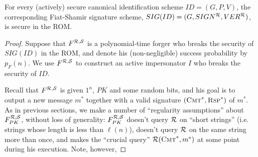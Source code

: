 \begin{thm}
For every (actively) secure canonical identification scheme $ID = (G,P,V)$,
the corresponding Fiat-Shamir signature scheme, $SIG(ID) =
(G,SIGN^{\mathcal{R}},VER^{\mathcal{R}})$, is secure in the ROM.
\end{thm}
\begin{proof}
Suppose that $F^{\mathcal{R},\mathcal{S}}$ is a polynomial-time forger who breaks the
security of $SIG(ID)$ in the ROM, and denote his (non-negligible) success
probability by $p_F(n)$. We use $F^{\mathcal{R},\mathcal{S}}$ to construct an active
impersonator $I$ who breaks the security of $ID$. 

Recall that $F^{\mathcal{R},\mathcal{S}}$ is given $1^n$, $PK$
and some random bits, and his goal is to output a new message 
$m^*$ together with a valid signature
$(\textsc{Cmt}^*,\textsc{Rsp}^*)$ of $m^*$.
As in previous sections, we make a number of ``regularity assumptions'' about
$F^{\mathcal{R},\mathcal{S}}_{PK}$, without loss of generality:
$F^{\mathcal{R},\mathcal{S}}_{PK}$ doesn't query $\mathcal{R}$ on ``short strings'' (i.e.
strings whose length is less than $\ell(n)$), doesn't query $\mathcal{R}$ on the
same string more than once, and makes the ``crucial query''
$\mathcal{R}(\textsc{Cmt}^*,m^*)$ at some point during his execution. Note, however,

\end{proof}
